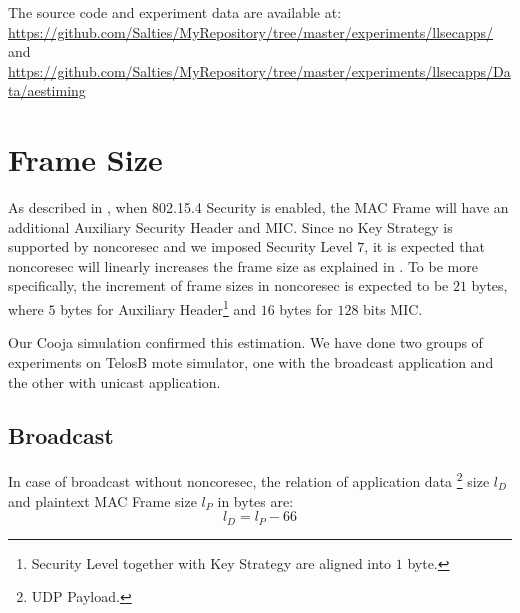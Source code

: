 The source code and experiment data are available at:\\
\url{https://github.com/Salties/MyRepository/tree/master/experiments/llsecapps/} \\
and \\
\url{https://github.com/Salties/MyRepository/tree/master/experiments/llsecapps/Data/aestiming}

%
%

\section{Frame Size} \label{noncoresec frame size}

As described in , when 802.15.4 Security is enabled, the MAC Frame will have an additional Auxiliary Security Header and MIC. Since no Key Strategy is supported by noncoresec and we imposed Security Level $7$, it is expected that noncoresec will linearly increases the frame size as explained in . To be more specifically, the increment of frame sizes in noncoresec is expected to be $21$ bytes, where $5$ bytes for Auxiliary Header\footnote{Security Level together with Key Strategy are aligned into $1$ byte.} and $16$ bytes for $128$ bits MIC.

Our Cooja simulation confirmed this estimation. We have done two groups of experiments on TelosB mote simulator, one with the broadcast application and the other with unicast application.


\subsection{Broadcast}
In case of broadcast without noncoresec, the relation of application data \footnote{UDP Payload.} size $l_D$ and plaintext MAC Frame size $l_P$ in bytes are:
\begin{equation}
	l_D = l_{P} - 66
\end{equation}

